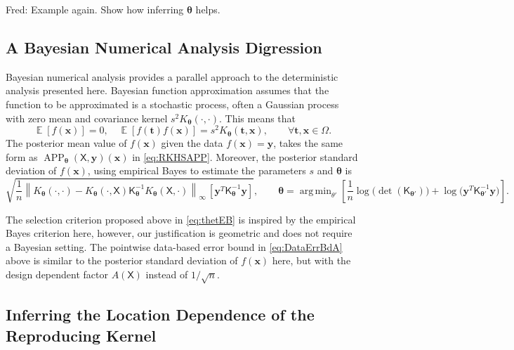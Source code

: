 \documentclass[]{mcom-l}
\theoremstyle{remark}
\DeclareMathOperator*{\argmin}{arg\,min}
\DeclareMathOperator{\APP}{APP}
\DeclareMathOperator{\Ex}{\mathbb{E}}
\newcommand{\mK}{\mathsf{K}}
\newcommand{\mX}{\mathsf{X}}
\newcommand{\bx}{{\boldsymbol{x}}}
\newcommand{\by}{{\boldsymbol{y}}}
\newcommand{\bt}{{\boldsymbol{t}}}
\newcommand{\btheta}{{\boldsymbol{\theta}}}
\newcommand{\cx}{{\Omega}}
\newcommand{\norm}[2][{}]{\ensuremath{\left \lVert #2 \right \rVert}_{#1}}
\newcommand{\FredNote}[1]{{\color{blue}Fred: #1}}
\begin{document}
\FredNote{Example again. Show how inferring $\btheta$ helps.}

\subsection{A Bayesian Numerical Analysis Digression} \label{sec:Bayes}

Bayesian numerical analysis \cite{Dia88a,RasWil06a,Ste99} provides a parallel approach to the deterministic analysis presented here.  Bayesian function approximation assumes that the function to be approximated is a stochastic process, often a Gaussian process with zero mean and covariance kernel $s^2 K_\btheta(\cdot, \cdot)$.  This means that 
\begin{equation*}
\Ex[f(\bx)] = 0, \quad \Ex[f(\bt) f(\bx)] = s^2K_\btheta(\bt,\bx), \qquad \forall \bt, \bx \in \cx.
\end{equation*}
The posterior mean value of $f(\bx)$ given the data $f(\bx) = \by$, takes the same form as $\APP_\btheta(\mX,\by)(\bx)$ in \eqref{eq:RKHSAPP}.  Moreover, the posterior standard deviation of $f(\bx)$, using empirical Bayes to estimate the parameters $s$ and $\btheta$ is \cite{Hic17a,??}
\begin{equation*}
\sqrt{\frac 1n \norm[\infty]{K_\btheta(\cdot,\cdot) - K_\btheta(\cdot,\mX) \mK_\btheta^{-1} K_\btheta(\mX,\cdot)} \, [\by^T \mK_\btheta^{-1} \by] }, \qquad \btheta = \argmin_{\theta'}  \left[\frac 1n \log \bigl( \det(\mK_{\btheta'}) \bigr) + \log \bigl ( \by^T \mK_{\btheta'}^{-1} \by \bigr)\right].
\end{equation*}

The selection criterion proposed above in \eqref{eq:thetEB} is inspired by the empirical Bayes criterion here, however, our justification is geometric and does not require a Bayesian setting.  The pointwise data-based error bound in \eqref{eq:DataErrBdA} above is similar to the posterior standard deviation of $f(\bx)$ here, but with the design dependent factor $A(\mX)$ instead of $1/\sqrt{n}$.


\subsection{Inferring the Location Dependence of the Reproducing Kernel} \label{sec:InferSpace}
\end{document}
